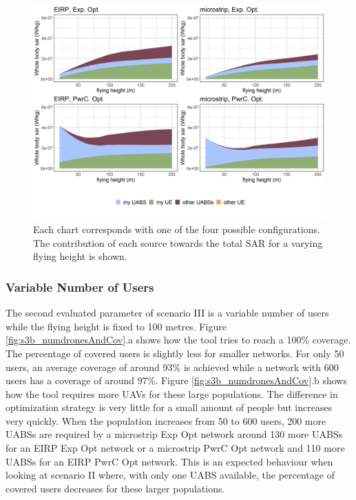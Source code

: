 \documentclass[twocolumn]{phdsymp} %
\begin{document}
\begin{figure}[h!]
  \includegraphics[width=\linewidth]{../results/s3/fhFourSources.png}
  \caption{Each chart corresponds with one of the four possible configurations. The contribution of each source towards the total 
  \gls{SAR} for a varying flying height is shown.}
  \label{fig:s3a_fourSourcesMatrix}
\end{figure}

\subsubsection{Variable Number of Users}

The second evaluated parameter of scenario III is a variable number of users while the flying height is fixed to 100 metres.  
Figure \ref{fig:s3b_numdronesAndCov}.a shows how the tool tries to reach a 100\% coverage. The percentage
of covered users is slightly less for smaller networks. For only 50 users, an average 
coverage of around 93\% is achieved while a network with 600 users has a coverage of around 97\%.
Figure \ref{fig:s3b_numdronesAndCov}.b shows how the tool requires more \gls{UAV}s for these large 
populations. 
The difference in optimization strategy is very little for a small amount of people but increases very quickly. 
When the population increases from 50 to 600 users,
 200 more \gls{UABS}s are required by a microstrip \gls{Exp Opt} network 
 around 130 more \gls{UABS}s for an \gls{EIRP} \gls{Exp Opt} network or a microstrip \gls{PwrC Opt} network
 and 110 more \gls{UABS}s for an \gls{EIRP} \gls{PwrC Opt} network.
This is an expected behaviour  when looking at scenario II where, with only one \gls{UABS} available, 
the percentage of covered users decreases for these larger populations.
\end{document}
